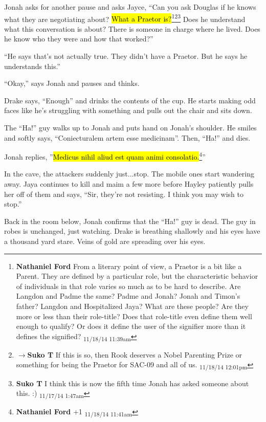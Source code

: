 Jonah asks for another pause and asks Jayce, ``Can you ask Douglas if he knows what they are negotiating about?  \hl{What a Praetor is?}\footnote{\textbf{Nathaniel Ford }From a literary point of view, a Praetor is a bit like a Parent. They are defined by a particular role, but the characteristic behavior of individuals in that role varies so much as to be hard to describe. Are Langdon and Padme the same? Padme and Jonah? Jonah and Timon's father? Langdon and Hospitalized Jaya? What are these people? Are they more or less than their role-title? Does that role-title even define them well enough to qualify? Or does it define the user of the signifier more than it defines the signified? \textsubscript{11/18/14 11:39am}}\footnote{$\rightarrow$\textbf{Suko T }If this is so, then Rook deserves a  Nobel Parenting Prize or something for being the Praetor for SAC-09 and all of us. \textsubscript{11/18/14 12:01pm}}\footnote{\textbf{Suko T }I think this is now the fifth time Jonah has asked someone about this. :) \textsubscript{11/17/14 1:47am}}  Does he understand what this conversation is about?  There is someone in charge where he lived.  Does he know who they were and how that worked?''

``He says that's not actually true.  They didn't have a Praetor.  But he says he understands this.''

``Okay,'' says Jonah and pauses and thinks.

Drake says, ``Enough'' and drinks the contents of the cup.  He starts making odd faces like he's struggling with something and pulls out the chair and sits down.



The ``Ha!'' guy walks up to Jonah and puts hand on Jonah's shoulder.  He smiles and softly says, ``Coniecturalem artem esse medicinam''. Then, ``Ha!'' and dies.

Jonah replies, ''\hl{Medicus nihil aliud est quam animi consolatio.}\footnote{\textbf{Nathaniel Ford }+1 \textsubscript{11/18/14 11:41am}}''



In the cave, the attackers suddenly just...stop.  The mobile ones start wandering away.  Jaya continues to kill and maim a few more before Hayley patiently pulls her off of them and says, ``Sir, they're not resisting.  I think you may wish to stop.''



Back in the room below, Jonah confirms that the ``Ha!'' guy is dead.  The guy in robes is unchanged, just watching.  Drake is breathing shallowly and his eyes have a thousand yard stare.  Veins of gold are spreading over his eyes.




